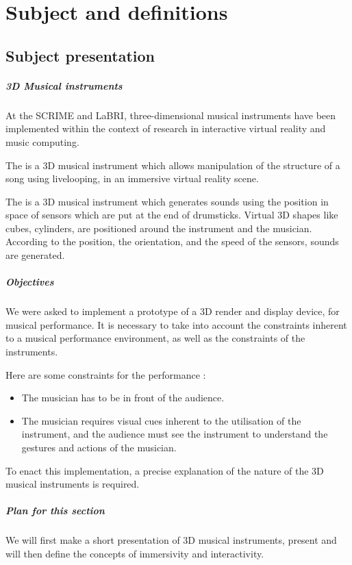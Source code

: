 \chapter{Subject and definitions}
\section{Subject presentation}
\paragraph{3D Musical instruments}
At the \ac{SCRIME} and \ac{LaBRI}, three-dimensional musical instruments have been implemented within the context of research in interactive virtual reality and music computing. 

The  \cite{berthaut2010drile} is a 3D musical instrument which allows manipulation of the structure of a song using \gls{livelooping}, in an immersive virtual reality scene.

The  is a 3D musical instrument which generates sounds using the position in space of sensors which are put at the end of drumsticks. Virtual 3D shapes like cubes, cylinders, are positioned around the instrument and the musician. According to the position, the orientation, and the speed of the sensors, sounds are generated.

\paragraph{Objectives}
We were asked to implement a prototype of a 3D render and display device, for musical performance.
It is necessary to take into account the constraints inherent to a musical performance environment, as well as the constraints of the instruments.

Here are some constraints for the performance : 
\begin{itemize}
\item The musician has to be in front of the audience.
\item The musician requires visual cues inherent to the utilisation of the instrument, and the audience must see the instrument to understand the gestures and actions of the musician.
\end{itemize}

To enact this implementation, a precise explanation of the nature of the 3D musical instruments is required.

\paragraph{Plan for this section}
We will first make a short presentation of 3D musical instruments, present and will then define the concepts of immersivity and interactivity.


